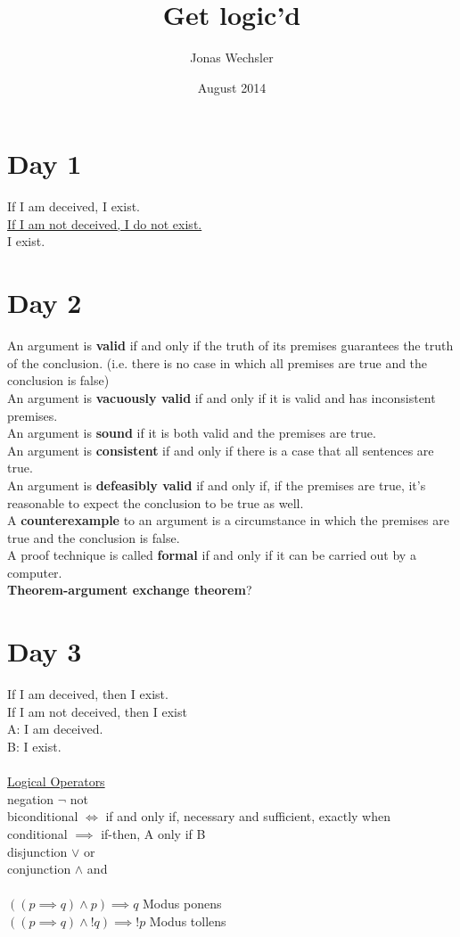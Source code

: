 \documentclass{article}
\title{Get logic'd}
\author{Jonas Wechsler}
\date{August 2014}
\begin{document}
\maketitle

\section{Day 1}
If I am deceived, I exist.
\\ \underline{If I am not deceived, I do not exist.}
\\ I exist.
\section{Day 2}
An argument is \textbf{valid} if and only if the truth of its premises guarantees the truth of the conclusion. (i.e. there is no case in which all premises are true and the conclusion is false)
\\An argument is \textbf{vacuously valid} if and only if it is valid and has inconsistent premises.
\\An argument is \textbf{sound} if it is both valid and the premises are true.
\\An argument is \textbf{consistent} if and only if there is a case that all sentences are true.
\\An argument is \textbf{defeasibly valid} if and only if, if the premises are true, it's reasonable to expect the conclusion to be true as well.
\\A \textbf{counterexample} to an argument is a circumstance in which the premises are true and the conclusion is false.
\\A proof technique is called \textbf{formal} if and only if it can be carried out by a computer.
\\\textbf{Theorem-argument exchange theorem}?
\section{Day 3}
If I am deceived, then I exist.\\
If I am not deceived, then I exist\\
A: I am deceived.\\
B: I exist.\\
\\
\underline{Logical Operators}\\
negation $\lnot$ not\\
biconditional $\iff$ if and only if, necessary and sufficient, exactly when\\
conditional $\implies$ if-then, A only if B\\
disjunction $\lor$ or\\
conjunction $\land$ and\\
\\
$((p \implies q) \land  p)\implies q$ Modus ponens\\
$((p \implies q) \land  !q)\implies !p$ Modus tollens\\
\end{document}
